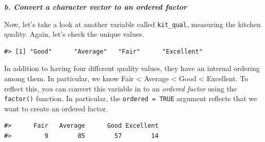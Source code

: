 \documentclass[
]{book}
\newenvironment{Shaded}{\begin{snugshade}}{\end{snugshade}}
\newcommand{\AttributeTok}[1]{\textcolor[rgb]{0.77,0.63,0.00}{#1}}
\newcommand{\CommentTok}[1]{\textcolor[rgb]{0.56,0.35,0.01}{\textit{#1}}}
\newcommand{\ConstantTok}[1]{\textcolor[rgb]{0.00,0.00,0.00}{#1}}
\newcommand{\FunctionTok}[1]{\textcolor[rgb]{0.00,0.00,0.00}{#1}}
\newcommand{\NormalTok}[1]{#1}
\newcommand{\OtherTok}[1]{\textcolor[rgb]{0.56,0.35,0.01}{#1}}
\newcommand{\SpecialCharTok}[1]{\textcolor[rgb]{0.00,0.00,0.00}{#1}}
\newcommand{\StringTok}[1]{\textcolor[rgb]{0.31,0.60,0.02}{#1}}
\begin{document}
\textbf{\emph{b. Convert a character vector to an ordered factor}}

Now, let's take a look at another variable called \texttt{kit\_qual}, measuring the kitchen quality. Again, let's check the unique values.

\begin{Shaded}
\end{Shaded}

\begin{verbatim}
#> [1] "Good"      "Average"   "Fair"      "Excellent"
\end{verbatim}

In addition to having four different quality values, they have an internal ordering among them. In particular, we know Fair \textless{} Average \textless{} Good \textless{} Excellent. To reflect this, you can convert this variable in to an \emph{ordered factor} using the \texttt{factor()} function. In particular, the \texttt{ordered\ =\ TRUE} argument reflects that we want to create an ordered factor.

\begin{Shaded}
\end{Shaded}

\begin{verbatim}
#>      Fair   Average      Good Excellent 
#>         9        85        57        14
\end{verbatim}

\begin{Shaded}
\end{Shaded}
\end{document}
